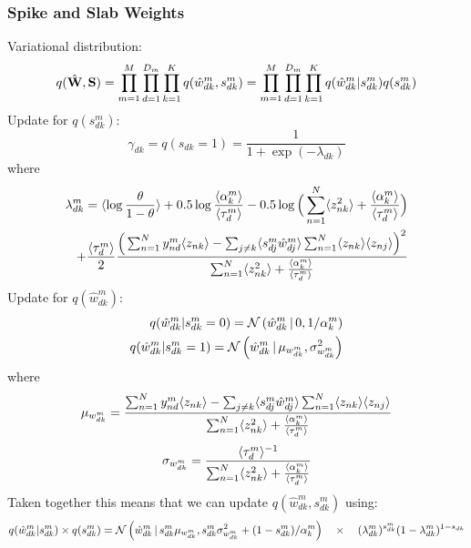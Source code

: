 \documentclass[10pt, a4paper,openany]{report}
\begin{document}
\subsubsection*{Spike and Slab Weights}
Variational distribution:
\[
q(\hat{{\bf W}},{\bf S}) = \prod_{m=1}^{M} \prod_{d=1}^{D_m} \prod_{k=1}^{K} q(\hat{w}_{dk}^m,s_{dk}^m) = \prod_{m=1}^{M} \prod_{d=1}^{D_m} \prod_{k=1}^{K} q(\hat{w}_{dk}^m|s_{dk}^m)q(s_{dk}^m)
\]
Update for $q(s_{dk}^m)$:
\[
\gamma_{dk} = q(s_{dk}=1) = \frac{1}{1+\exp(-\lambda_{dk})}
\]
where
\begin{align*}
\lambda_{dk}^m = \langle \log\frac{\theta}{1-\theta} \rangle + 0.5\log\frac{\langle\alpha_k^m\rangle}{\langle\tau_d^m\rangle} - 0.5\log\Big( \sum_{n=1}^{N} \langle z_{nk}^2 \rangle + \frac{\langle\alpha_k^m\rangle}{\langle\tau_d^m\rangle} \Big) \\
+ \frac{\langle\tau_d^m\rangle}{2} \frac{ \Big( \sum_{n=1}^{N} y_{nd}^m \langle z_{nk} \rangle - \sum_{j \neq k} \langle s_{dj}^m\hat{w}_{dj}^m\rangle \sum_{n=1}^{N} \langle z_{nk} \rangle \langle z_{nj} \rangle \Big)^2} {\sum_{n=1}^{N} \langle z_{nk}^2 \rangle + \frac{\langle\alpha_k^m\rangle}{\langle\tau_d^m\rangle} }
\end{align*}
Update for $q(\hat{w}_{dk}^m)$:
\begin{align*}
q(\hat{w}_{dk}^m|s_{dk}^m=0) = \mathcal{N}\left(\hat{w}_{dk}^m \,|\, 0,1/\alpha_k^m\right) \\
q(\hat{w}_{dk}^m|s_{dk}^m=1) = \mathcal{N}\left(\hat{w}_{dk}^m \,|\, \mu_{w_{dk}^m},\sigma_{w_{dk}^m}^2\right)
\end{align*}
where
\[
\mu_{w_{dk}^m} = \frac{ \sum_{n=1}^{N} y_{nd}^m \langle z_{nk} \rangle - \sum_{j \neq k} \langle s_{dj}^m\hat{w}_{dj}^m \rangle \sum_{n=1}^{N} \langle z_{nk} \rangle \langle z_{nj} \rangle } { \sum_{n=1}^{N} \langle z_{nk}^2 \rangle + \frac{\langle\alpha_k^m\rangle}{\langle\tau_d^m\rangle} }
\]
\[
\sigma_{w_{dk}^m} = \frac{ \langle\tau_d^m\rangle^{-1} } { \sum_{n=1}^{N} \langle z_{nk}^2 \rangle + \frac{\langle\alpha_k^m\rangle}{\langle\tau_d^m\rangle} }
\]
Taken together this means that we can update $q(\hat{w}_{dk}^m,s_{dk}^m)$ using:
\[
q(\hat{w}_{dk}^m|s_{dk}^m) \times q(s_{dk}^m) = \mathcal{N}\left( \hat{w}_{dk}^m  \,|\,  s_{dk}^m \mu_{w_{dk}^m}, s_{dk}^m\sigma_{w_{dk}^m}^2 + (1-s_{dk}^m)/\alpha_k^m\right) \quad \times \quad (\lambda_{dk}^m)^{s_{dk}^m} (1-\lambda_{dk}^m)^{1-s_{dk}}
\]
\end{document}
